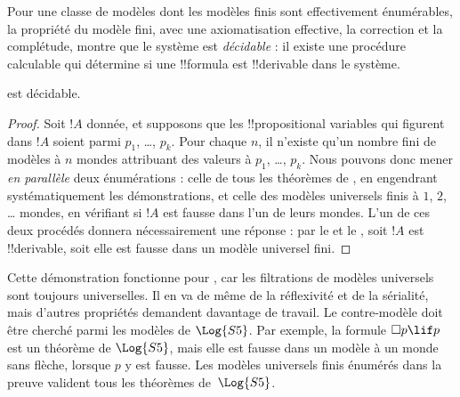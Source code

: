 \documentclass[../../../include/open-logic-section]{subfiles}
\begin{document}


Pour une classe de modèles dont les modèles finis sont effectivement énumérables,
la propriété du modèle fini, avec une axiomatisation effective, la correction
et la complétude, montre que le système est \emph{décidable} :
il existe une procédure calculable qui détermine si une !!{formula}
est !!{derivable} dans le système.

\begin{thm}
   est décidable.
\end{thm}

\begin{proof}
  Soit $!A$ donnée, et supposons que les !!{propositional variable}s
  qui figurent dans $!A$ soient parmi $p_1$, \dots, $p_k$. Pour
  chaque $n$, il n'existe qu'un nombre fini de modèles à $n$ mondes
  attribuant des valeurs à $p_1$, \dots, $p_k$. Nous pouvons donc
  mener \emph{en parallèle} deux énumérations : celle de tous les
  théorèmes de , en engendrant systématiquement les
  démonstrations, et celle des modèles universels finis à $1$, $2$,
  \dots{} mondes, en vérifiant si $!A$ est fausse dans l'un de leurs
  mondes. L'un de ces deux procédés donnera nécessairement une réponse :
  par le  et le
  , soit $!A$ est !!{derivable}, soit elle est
  fausse dans un modèle universel fini.
\end{proof}

Cette démonstration fonctionne pour , car les filtrations de
modèles universels sont toujours universelles. Il en va de même de la
réflexivité et de la sérialité, mais d'autres propriétés demandent
davantage de travail.
Le contre-modèle doit être cherché parmi les modèles de
$\Log{S5}$. Par exemple, la formule $\Box p\lif p$ est
un théorème de $\Log{S5}$, mais elle est fausse dans un
modèle à un monde sans flèche, lorsque $p$ y est fausse.
Les modèles universels finis énumérés dans la preuve
valident tous les théorèmes de~$\Log{S5}$.
\end{document}
